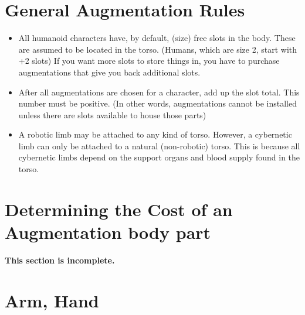 \documentclass[twoside]{book}
\begin{document}
    

\section{General Augmentation Rules}
    
\begin{itemize}
      
  \item   All humanoid characters have, by default, (size)
               free slots in the body. These are assumed to be located in
               the torso. (Humans, which are size 2, start with +2 slots)
               If you want more slots to store things in, you have to
               purchase augmentations that give you back additional
               slots. 
  \item   After all augmentations are chosen for a character,
               add up the slot total. This number must be positive. (In
               other words, augmentations cannot be installed unless
               there are slots available to house those parts) 
  \item   A robotic limb may be attached to any kind of
               torso. However, a cybernetic limb can only be attached to
               a natural (non-robotic) torso. This is because all
               cybernetic limbs depend on the support organs and blood
               supply found in the torso. 
\end{itemize}
  
    

\section{Determining the Cost of an Augmentation body part}
    

 \textbf{ This section is incomplete. }


    

\section{Arm, Hand}
    
\end{document}
